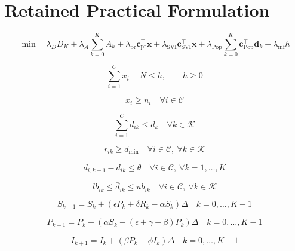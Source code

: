 \documentclass{article}
\begin{document}
\section*{Retained Practical Formulation}
\begin{equation}
\min \quad
\lambda_D D_K
+ \lambda_A \sum_{k=0}^{K} A_k
+ \lambda_{\mathrm{pr}} \mathbf c_{\mathrm{pr}}^\top \mathbf x
+ \lambda_{\mathrm{SVI}} \mathbf c_{\mathrm{SVI}}^\top \mathbf x
+ \lambda_{\mathrm{Pop}} \sum_{k=0}^{K} \mathbf c_{\mathrm{Pop}}^\top \bar{\mathbf d}_k
+ \lambda_{\mathrm{inf}} h
\tag{Prac-Obj}
\end{equation}

\begin{equation}
\sum_{i=1}^{C} x_i - N \le h,\qquad h \ge 0
\tag{27}
\end{equation}

\begin{equation}
x_i \ge n_i
\quad \forall i \in \mathcal C
\tag{28a}
\end{equation}

\begin{equation}
\sum_{i=1}^{C} \bar d_{ik} \le d_k
\quad \forall k \in \mathcal K
\tag{28c}
\end{equation}

\begin{equation}
r_{ik} \ge d_{\min}
\quad \forall i \in \mathcal C,\ \forall k \in \mathcal K
\tag{28d}
\end{equation}

\begin{equation}
\bar d_{i,k-1} - \bar d_{ik} \le \theta
\quad \forall i \in \mathcal C,\ \forall k = 1,\dots,K
\tag{28e}
\end{equation}

\begin{equation}
lb_{ik} \le \bar d_{ik} \le ub_{ik}
\quad \forall i \in \mathcal C,\ \forall k \in \mathcal K
\tag{28f}
\end{equation}

\begin{equation}
S_{k+1} = S_k + (\epsilon P_k + \delta R_k - \alpha S_k)\Delta
\quad k=0,\dots,K-1
\tag{28g}
\end{equation}

\begin{equation}
P_{k+1} = P_k + (\alpha S_k - (\epsilon+\gamma+\beta)P_k)\Delta
\quad k=0,\dots,K-1
\tag{28h}
\end{equation}

\begin{equation}
I_{k+1} = I_k + (\beta P_k - \phi I_k)\Delta
\quad k=0,\dots,K-1
\tag{28i}
\end{equation}
\end{document}
